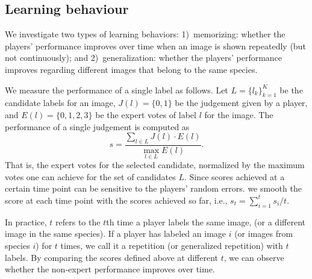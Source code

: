 \subsection{Learning behaviour}

We investigate two types of learning behaviors: 
1)~memorizing: whether the players' performance improves
over time when an image is shown repeatedly (but not continuously);
and 2)~generalization: whether the players' performance
improves regarding different images that belong to the same species.  

We measure the performance of a single label as follows. 
Let $L=\{l_k\}_{k=1}^K$ be the candidate labels for an image, 
$J(l)=\{0, 1\}$ be the judgement given by a player, 
and $E(l)=\{0, 1, 2, 3\}$ be the expert votes of label $l$ for the image. 
The performance of a single judgement is computed as
%
\begin{equation}
 s =  \frac{\sum_{l \in L} J(l) \cdot E(l)}{\max_{l \in L} E(l)}. 
 \label{eq:score}
\end{equation}
%
That is, the expert votes for the selected candidate,  normalized by the
maximum votes one can achieve for the set of candidates $L$.
%
Since scores achieved at a certain time point can be sensitive to the players' random errors. 
we smooth the score at each time point with the scores achieved so far, i.e., 
$s_t = \sum_{i=1}^t s_i / t$.

In practice, $t$ refers to the $t$th time a player labels the same image, (or a different image in the same species). 
If a player has labeled an image $i$ (or images from species $i$) for $t$ times, we call it a repetition 
(or generalized repetition) with $t$ labels. 
By comparing the scores defined above at different $t$, 
we can observe whether the non-expert performance improves over time.

